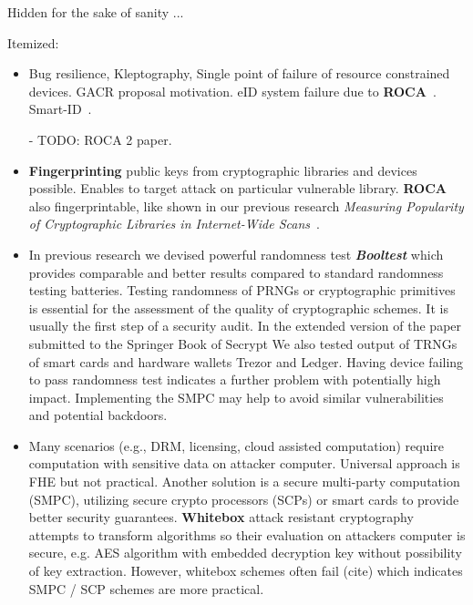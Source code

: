 \documentclass[
  digital, %
  twoside, %
  table,   %
  lof,     %
  lot,     %
]{fithesis3}
\theoremstyle{definition}
\theoremstyle{remark}
\begin{document}
Hidden for the sake of sanity ...
\begin{ecmmnt}  %

Itemized:
\begin{itemize}
	\item Bug resilience, Kleptography, Single point of failure of resource constrained devices. GACR proposal motivation. eID system failure due to {\bf{ROCA}}~\cite{2017-ccs-nemec}. Smart-ID~\cite{smart_id_ee}. 
    
    - TODO: ROCA 2 paper.
        
    \item {\bf{Fingerprinting}} public keys from cryptographic libraries and devices possible. Enables to target attack on particular vulnerable library. {\bf{ROCA}} also fingerprintable, like shown in our previous research {\it{Measuring Popularity of Cryptographic Libraries in Internet-Wide Scans}}~\cite{2017-acsac-nemec}.
    
        \item In previous research we devised powerful randomness test {\bf{\emph{Booltest}}} \cite{booltest_secrypt2017} which provides comparable and better results compared to standard randomness testing batteries. Testing randomness of PRNGs or cryptographic primitives is essential for the assessment of the quality of cryptographic schemes. It is usually the first step of a security audit. In the extended version of the paper submitted to the Springer Book of Secrypt We also tested output of TRNGs of smart cards and hardware wallets Trezor and Ledger. Having device failing to pass randomness test indicates a further problem with potentially high impact. Implementing the SMPC may help to avoid similar vulnerabilities and potential backdoors. 
    
    \item Many scenarios (e.g., DRM, licensing, cloud assisted computation) require computation with sensitive data on attacker computer. Universal approach is FHE but not practical. Another solution is a secure multi-party computation (SMPC), utilizing secure crypto processors (SCPs) or smart cards to provide better security guarantees. {\bf{Whitebox}} attack resistant cryptography \cite{whitebox_klinec_santacrypt2013,Klinec2013thesis} attempts to transform algorithms so their evaluation on attackers computer is secure, e.g. AES algorithm with embedded decryption key without possibility of key extraction. However, whitebox schemes often fail (cite) which indicates SMPC / SCP schemes are more practical.
    

\end{itemize}
\end{ecmmnt}
\end{document}
